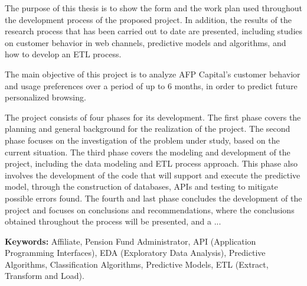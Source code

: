 The purpose of this thesis is to show the form and the work plan used throughout the development process of the proposed project. In addition, the results of the research process that has been carried out to date are presented, including studies on customer behavior in web channels, predictive models and algorithms, and how to develop an ETL process.

The main objective of this project is to analyze AFP Capital's customer behavior and usage preferences over a period of up to 6 months, in order to predict future personalized browsing.

The project consists of four phases for its development. The first phase covers the planning and general background for the realization of the project. The second phase focuses on the investigation of the problem under study, based on the current situation. The third phase covers the modeling and development of the project, including the data modeling and ETL process approach. This phase also involves the development of the code that will support and execute the predictive model, through the construction of databases, APIs and testing to mitigate possible errors found. The fourth and last phase concludes the development of the project and focuses on conclusions and recommendations, where the conclusions obtained throughout the process will be presented, and a ...

\textbf{Keywords:} Affiliate, Pension Fund Administrator, API (Application Programming Interfaces), EDA (Exploratory Data Analysis), Predictive Algorithms, Classification Algorithms, Predictive Models, ETL (Extract, Transform and Load).